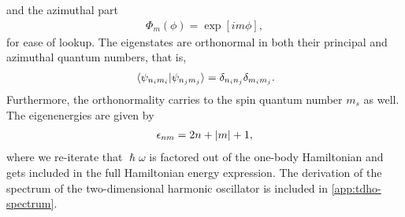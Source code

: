             and the azimuthal part
            \begin{align}
                \Phi_{m}(\phi) = \exp[i m \phi],
            \end{align}
            for ease of lookup.
            The eigenstates are orthonormal in both their principal and
            azimuthal quantum numbers, that is,
            \begin{align}
                \braket*{\psi_{n_i m_i}}{\psi_{n_j m_j}}
                = \delta_{n_i n_j}\delta_{m_i m_j}.
            \end{align}
            Furthermore, the orthonormality carries to the spin quantum number
            $m_s$ as well.
            The eigenenergies are given by
            \begin{align}
                \epsilon_{nm}
                = 2n + \abs{m} + 1,
                \label{eq:eigenenergy-tdho}
            \end{align}
            where we re-iterate that $\hslash\omega$ is factored out of the
            one-body Hamiltonian and gets included in the full Hamiltonian
            energy expression.
            The derivation of the spectrum of the two-dimensional harmonic
            oscillator is included in \autoref{app:tdho-spectrum}.

